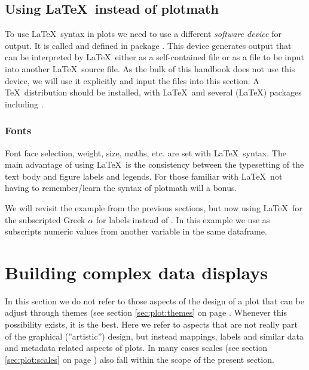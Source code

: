 \documentclass[krantz2]{krantz}\usepackage{knitr}%
\begin{document}
\subsection{Using \LaTeX\ instead of plotmath}
To use \LaTeX\ syntax in plots we need to use a different \emph{software device} for output. It is called  and defined in package . This device generates output that can be interpreted by \LaTeX\ either as a self-contained file or as a file to be input into another \LaTeX\ source file. As the bulk of this handbook does not use this device, we will use it explicitly and input the files into this section. A \TeX\ distribution should be installed, with \LaTeX\ and several (\LaTeX) packages including .

\subsubsection{Fonts}

Font face selection, weight, size, maths, etc. are set with \LaTeX\ syntax. The main advantage of using \LaTeX\ is the consistency between the typesetting of the text body and figure labels and legends. For those familiar with \LaTeX\ not having to remember/learn the syntax of plotmath will a bonus.

We will revisit the example from the previous sections, but now using \LaTeX\ for the subscripted Greek $\alpha$ for labels instead of . In this example we use as subscripts numeric values from another variable in the same dataframe.

\section{Building complex data displays}

In this section we do not refer to those aspects of the design of a plot that can be adjust through themes (see section \ref{sec:plot:themes} on page \pageref{sec:plot:themes}. Whenever this possibility exists, it is the best. Here we refer to aspects that are not really part of the graphical (''artistic'') design, but instead mappings, labels and similar data and metadata related aspects of plots. In many cases scales (see section \ref{sec:plot:scales} on page \pageref{sec:plot:scales}) also fall within the scope of the present section.
\end{document}
